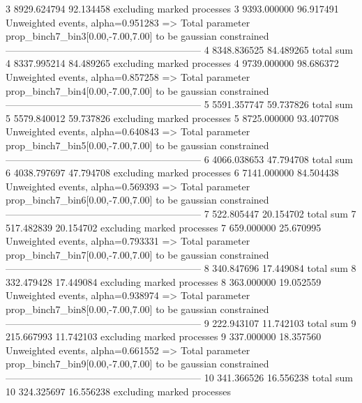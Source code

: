 3          8929.624794     92.134458       excluding marked processes    
3          9393.000000     96.917491       Unweighted events, alpha=0.951283
  => Total parameter prop_binch7_bin3[0.00,-7.00,7.00] to be gaussian constrained
------------------------------------------------------------
4          8348.836525     84.489265       total sum                     
4          8337.995214     84.489265       excluding marked processes    
4          9739.000000     98.686372       Unweighted events, alpha=0.857258
  => Total parameter prop_binch7_bin4[0.00,-7.00,7.00] to be gaussian constrained
------------------------------------------------------------
5          5591.357747     59.737826       total sum                     
5          5579.840012     59.737826       excluding marked processes    
5          8725.000000     93.407708       Unweighted events, alpha=0.640843
  => Total parameter prop_binch7_bin5[0.00,-7.00,7.00] to be gaussian constrained
------------------------------------------------------------
6          4066.038653     47.794708       total sum                     
6          4038.797697     47.794708       excluding marked processes    
6          7141.000000     84.504438       Unweighted events, alpha=0.569393
  => Total parameter prop_binch7_bin6[0.00,-7.00,7.00] to be gaussian constrained
------------------------------------------------------------
7          522.805447      20.154702       total sum                     
7          517.482839      20.154702       excluding marked processes    
7          659.000000      25.670995       Unweighted events, alpha=0.793331
  => Total parameter prop_binch7_bin7[0.00,-7.00,7.00] to be gaussian constrained
------------------------------------------------------------
8          340.847696      17.449084       total sum                     
8          332.479428      17.449084       excluding marked processes    
8          363.000000      19.052559       Unweighted events, alpha=0.938974
  => Total parameter prop_binch7_bin8[0.00,-7.00,7.00] to be gaussian constrained
------------------------------------------------------------
9          222.943107      11.742103       total sum                     
9          215.667993      11.742103       excluding marked processes    
9          337.000000      18.357560       Unweighted events, alpha=0.661552
  => Total parameter prop_binch7_bin9[0.00,-7.00,7.00] to be gaussian constrained
------------------------------------------------------------
10         341.366526      16.556238       total sum                     
10         324.325697      16.556238       excluding marked processes    
